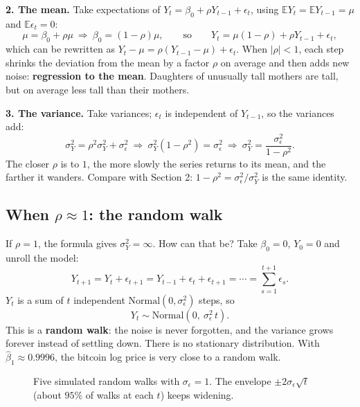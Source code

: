 \documentclass[11pt]{article}
\newcommand{\E}{\mathbb{E}}
\newcommand{\Norm}{\text{Normal}}
\begin{document}
\textbf{2. The mean.} Take expectations of $Y_t=\beta_0+\rho Y_{t-1}+\epsilon_t$, using $\E Y_t=\E Y_{t-1}=\mu$ and $\E\epsilon_t=0$:
\[
\mu=\beta_0+\rho\mu\ \Longrightarrow\ \beta_0=(1-\rho)\mu,\qquad\text{so}\qquad Y_t=\mu(1-\rho)+\rho Y_{t-1}+\epsilon_t,
\]
which can be rewritten as $Y_t-\mu=\rho(Y_{t-1}-\mu)+\epsilon_t$. When $|\rho|<1$, each step shrinks the deviation from the mean by a factor $\rho$
on average and then adds new noise: \textbf{regression to the mean}. Daughters of unusually tall mothers are tall, but on average less tall
than their mothers.

\textbf{3. The variance.} Take variances; $\epsilon_t$ is independent of $Y_{t-1}$, so the variances add:
\[
\sigma_Y^2=\rho^2\sigma_Y^2+\sigma_\epsilon^2\ \Longrightarrow\ \sigma_Y^2(1-\rho^2)=\sigma_\epsilon^2\ \Longrightarrow\ \sigma_Y^2=\frac{\sigma_\epsilon^2}{1-\rho^2}.
\]
The closer $\rho$ is to $1$, the more slowly the series returns to its mean, and the farther it wanders. Compare with Section 2:
$1-\rho^2=\sigma_\epsilon^2/\sigma_Y^2$ is the same identity.

\subsection{When $\rho\approx1$: the random walk}
If $\rho=1$, the formula gives $\sigma_Y^2=\infty$. How can that be? Take $\beta_0=0$, $Y_0=0$ and unroll the model:
\[
Y_{t+1}=Y_t+\epsilon_{t+1}=Y_{t-1}+\epsilon_t+\epsilon_{t+1}=\cdots=\sum_{s=1}^{t+1}\epsilon_s .
\]
$Y_t$ is a sum of $t$ independent $\Norm(0,\sigma_\epsilon^2)$ steps, so
\[
Y_t\sim\Norm(0,\ \sigma_\epsilon^2\,t).
\]
This is a \textbf{random walk}: the noise is never forgotten, and the variance grows forever instead of settling down. There is no stationary
distribution. With $\hat\beta_1\approx0.9996$, the bitcoin log price is very close to a random walk.

\begin{figure}[h]
\centering
{}
\caption{Five simulated random walks with $\sigma_\epsilon=1$. The envelope $\pm2\sigma_\epsilon\sqrt t$ (about $95\%$ of walks at each $t$) keeps widening.}
\end{figure}
\end{document}
